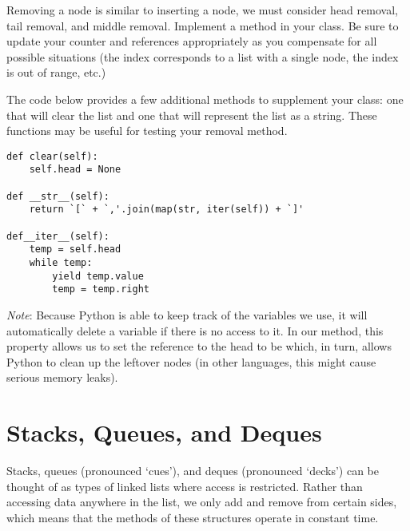 \begin{problem}
Removing a node is similar to inserting a node, we must consider head removal, tail removal, and middle removal.
Implement a  method in your  class.
Be sure to update your counter and references appropriately as you compensate for all possible situations  (the index corresponds to a list with a single node, the index is out of range, etc.)

The code below provides a few additional methods to supplement your  class: one that will clear the list and one that will represent the list as a string.
These functions may be useful for testing your removal method.
\begin{lstlisting}
def clear(self):
    self.head = None

def __str__(self):
    return `[` + `,'.join(map(str, iter(self)) + `]'
    
def__iter__(self):
    temp = self.head
    while temp:
        yield temp.value
        temp = temp.right
\end{lstlisting}
\emph{Note}: Because Python is able to keep track of the variables we use, it will automatically delete a variable if there is no access to it.
In our  method, this property allows us to set the reference to the head to be  which, in turn, allows Python to clean up the leftover nodes (in other languages, this might cause serious memory leaks).
\label{prob:LinkedList}
\end{problem}

\section*{Stacks, Queues, and Deques}
Stacks, queues (pronounced `cues'), and deques (pronounced `decks') can be thought of as types of linked lists where access is restricted.
Rather than accessing data anywhere in the list, we only add and remove from certain sides, which means that the methods of these structures operate in constant time.

